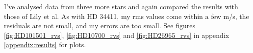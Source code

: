 I've analysed data from three more stars and again compared the results with those of Lily et al. As with HD 34411, my rms values come within a few m/s, the residuals are not small, and my errors are too small. See figures \ref{fig:HD101501_rvs}, \ref{fig:HD10700_rvs} and \ref{fig:HD26965_rvs} in appendix \ref{appendix:results} for plots. 
